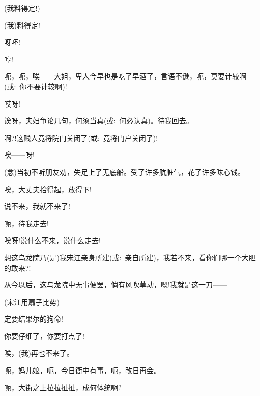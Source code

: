 {

{(我料得定!)}

{(我)料得定!}

{呀呸!}\hspace{20pt}~


{哼!}\hspace{30pt}~


{呃，呃，唉------大姐，卑人今早也是吃了早酒了，言语不逊，呃，莫要计较啊(或:~你不要计较啊)!}

{哎呀!}\hspace{20pt}~


{诶呀，夫妇争论几句，何须当真(或:~何必认真)。待我回去。}

{啊?!这贱人竟将院门关闭了(或:~竟将门户关闭了)!}

{唉------呀!}

{({\akai 念})当初不听朋友劝，失足上了无底船。受了许多肮脏气，花了许多昧心钱。}

{唉，大丈夫拾得起，放得下!}

{说不来，我就不来了!}

{呃，待我走去!}

{唉呀!说什么不来，说什么走去!}

{想这乌龙院乃(是)我宋江亲身所建}(或:~亲自所建){，我若不来，看你们哪一个大胆的敢来?!}

{从今以后，这乌龙院中无事便罢，倘有风吹草动，嗯!我就是这一刀------}

{(宋江用扇子比势)}

{定要结果尔的狗命!}

{你要仔细了，你要打点了!}

{唉，(我)再也不来了。}

{\vspace{5pt}}

{呃，妈儿娘，呃，今日衙中有事，呃，改日再会。}

{呃，大街之上拉拉扯扯，成何体统啊?}

}
